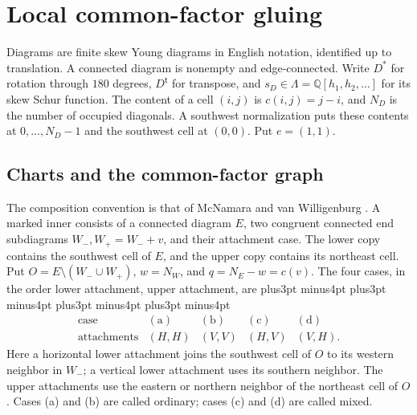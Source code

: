 \documentclass[11pt,a4paper]{amsart}
\numberwithin{equation}{section}
\theoremstyle{plain}
\theoremstyle{definition}
\newcommand{\Lam}{\Lambda}
\newcommand{\Q}{\mathbb Q}
\begin{document}
\section{Local common-factor gluing}\label{sec:gluing}

Diagrams are finite skew Young diagrams in English notation, identified up to translation.  A connected diagram is nonempty and edge-connected.  Write \(D^*\) for rotation through \(180\) degrees, \(D^{\mathsf t}\) for transpose, and \(s_D\in\Lam=\Q[h_1,h_2,\ldots]\) for its skew Schur function.  The content of a cell \((i,j)\) is \(c(i,j)=j-i\), and \(N_D\) is the number of occupied diagonals.  A southwest normalization puts these contents at \(0,\ldots,N_D-1\) and the southwest cell at \((0,0)\).  Put \(e=(1,1)\).

\subsection{Charts and the common-factor graph}

The composition convention is that of McNamara and van Willigenburg \cite[Def.~3.11]{McNamara2009Classification}.  A marked inner consists of a connected diagram \(E\), two congruent connected end subdiagrams \(W_-,W_+=W_-+v\), and their attachment case.  The lower copy contains the southwest cell of \(E\), and the upper copy contains its northeast cell.  Put \(O=E\setminus(W_-\cup W_+)\), \(w=N_W\), and \(q=N_E-w=c(v)\).  The four cases, in the order lower attachment, upper attachment, are
{\abovedisplayskip=14pt plus3pt minus4pt \belowdisplayskip=14pt plus3pt minus4pt
 \abovedisplayshortskip=14pt plus3pt minus4pt \belowdisplayshortskip=14pt plus3pt minus4pt
\begin{equation*}
 \begin{array}{c|cccc}
 \text{case}&\mathrm{(a)}&\mathrm{(b)}&\mathrm{(c)}&\mathrm{(d)}\\ \hline
 \text{attachments}&(H,H)&(V,V)&(H,V)&(V,H).
 \end{array}
\end{equation*}}
Here a horizontal lower attachment joins the southwest cell of \(O\) to its western neighbor in \(W_-\); a vertical lower attachment uses its southern neighbor.  The upper attachments use the eastern or northern neighbor of the northeast cell of \(O\).  Cases (a) and (b) are called ordinary; cases (c) and (d) are called mixed.
\end{document}
